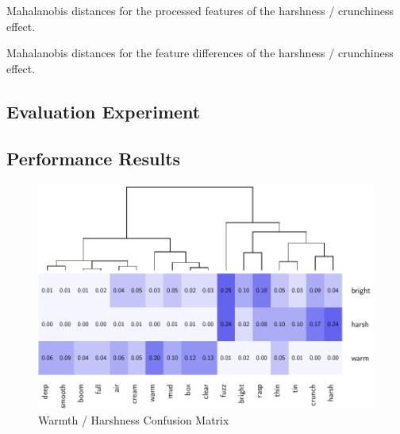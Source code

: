 			\begin{table}[h!]
				\centering
				
				\caption{Mahalanobis distances for the processed 
					 features of the harshness / crunchiness effect.}
				\label{tab:CrunchProcJeff}
			\end{table}

			\begin{table}[h!]
				\centering
				
				\caption{Mahalanobis distances for the feature differences of 
					 the harshness / crunchiness effect.}
				\label{tab:CrunchDiffJeff}
			\end{table}

	\subsection{Evaluation Experiment}
	\label{sec:PerceptualExperiments-SemanticControl-EvaluationExperiment}

	\subsection{Performance Results}
	\label{sec:PerceptualExperiments-SemanticControl-PerformanceResults}

		\begin{figure}[h!]
			\centering
			\includegraphics{chapter7/Images/HarshConfusion.pdf}
			\caption{Warmth / Harshness Confusion Matrix}
		\end{figure}

